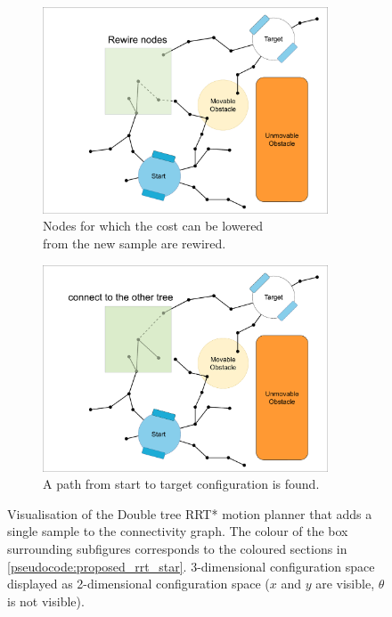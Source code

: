\begin{figure}[H]
    \begin{subfigure}{.49\textwidth}
    \centering
    \includegraphics[width=0.93\textwidth, cfbox=my_green 5pt 0pt]{figures/mp/5mp_rewire.drawio.png}
    \caption{Nodes for which the cost can be lowered\\from the new sample are rewired.}%
    \label{subfig:mp_rewire}
    \end{subfigure}
    \begin{subfigure}{.49\textwidth}
    \centering
    \includegraphics[width=0.93\textwidth, cfbox=my_green 5pt 0pt]{figures/mp/6mp_search_other_tree.drawio.png}
    \caption{A path from start to target configuration is found. \bs}
    \end{subfigure}

    \caption{Visualisation of the Double tree \acs{RRT*} motion planner that adds a single sample to the connectivity graph. The colour of the box surrounding subfigures corresponds to the coloured sections in \cref{pseudocode:proposed_rrt_star}. 3-dimensional configuration space displayed as 2-dimensional configuration space ($x$ and $y$ are visible, $\theta$ is not visible).}
    \label{fig:motion_planner_adding_one_sample}
\end{figure}


